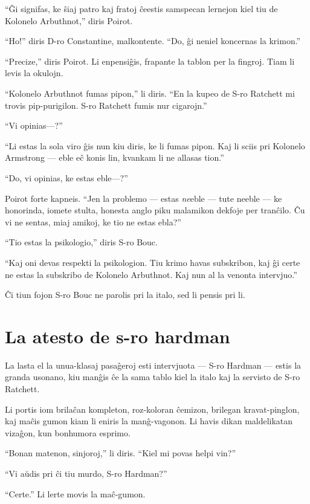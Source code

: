 ``Ĝi signifas, ke ŝiaj patro kaj fratoj ĉeestis samspecan lernejon kiel tiu de Kolonelo Arbuthnot,'' diris Poirot.

``Ho!'' diris D-ro Constantine, malkontente. ``Do, ĝi neniel koncernas la krimon.''

``Precize,'' diris Poirot. Li enpensiĝis, frapante la tablon per la fingroj. Tiam li levis la okulojn.

``Kolonelo Arbuthnot fumas pipon,'' li diris. ``En la kupeo de S-ro Ratchett mi trovis pip-purigilon. S-ro Ratchett fumis nur cigarojn.''

``Vi opinias---?''

``Li estas la sola viro ĝis nun kiu diris, ke li fumas pipon. Kaj li sciis pri Kolonelo Armstrong --- eble eĉ konis lin, kvankam li ne allasas tion.''

``Do, vi opinias, ke estas eble---?''

Poirot forte kapneis. ``Jen la problemo --- estas \emph{ne}eble --- tute neeble --- ke honorinda, iomete stulta, honesta anglo piku malamikon dekfoje per tranĉilo. Ĉu vi ne sentas, miaj amikoj, ke tio ne estas ebla?''

``Tio estas la psikologio,'' diris S-ro Bouc.

``Kaj oni devas respekti la psikologion. Tiu krimo havas subskribon, kaj ĝi certe ne estas la subskribo de Kolonelo Arbuthnot. Kaj nun al la venonta intervjuo.''

Ĉi tiun fojon S-ro Bouc ne parolis pri la italo, sed li pensis pri li.

\chapter[La atesto de s-ro hardman]{La atesto de s-ro hardman}


La lasta el la unua-klasaj pasaĝeroj esti intervjuota --- S-ro Hardman --- estis la granda usonano, kiu manĝis ĉe la sama tablo kiel la italo kaj la servisto de S-ro Ratchett.

Li portis iom brilaĉan kompleton, roz-koloran ĉemizon, brilegan kravat-pinglon, kaj maĉis gumon kiam li eniris la manĝ-vagonon. Li havis dikan maldelikatan vizaĝon, kun bonhumora esprimo.

``Bonan matenon, sinjoroj,'' li diris. ``Kiel mi povas helpi vin?''

``Vi aŭdis pri ĉi tiu murdo, S-ro Hardman?''

``Certe.'' Li lerte movis la maĉ-gumon.

